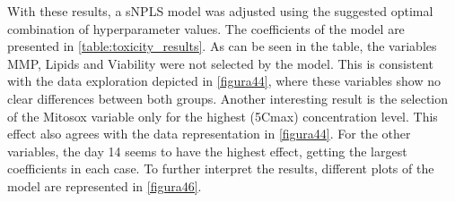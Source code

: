 With these results, a sNPLS model was adjusted using the suggested optimal combination of hyperparameter values. The coefficients of the model are presented in \autoref{table:toxicity_results}. As can be seen in the table, the variables MMP, Lipids and Viability were not selected by the model. This is consistent with the data exploration depicted in \autoref{figura44}, where these variables show no clear differences between both groups. Another interesting result is the selection of the Mitosox variable only for the highest (5Cmax) concentration level. This effect also agrees with the data representation in \autoref{figura44}. For the other variables, the day 14 seems to have the highest effect, getting the largest coefficients in each case. To further interpret the results, different plots of the model are represented in \autoref{figura46}.

